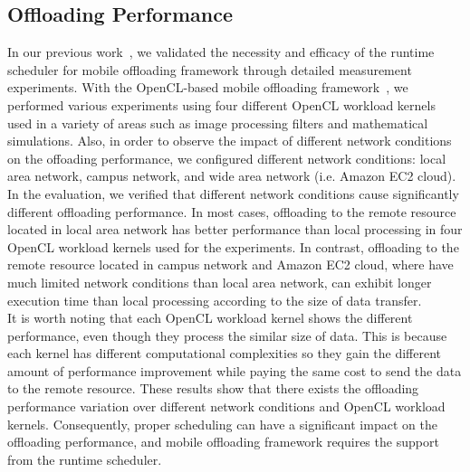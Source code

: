 \documentclass[10pt, conference, compsocconf]{IEEEtran}
\begin{document}
\subsection{Offloading Performance}
%
In our previous work~\cite{ml}, we validated the necessity and efficacy
of the runtime scheduler for mobile offloading framework through
detailed measurement experiments.
%
With the OpenCL-based mobile offloading framework~\cite{ocloff}, we
performed various experiments using four different OpenCL workload
kernels used in a variety of areas such as image processing filters and
mathematical simulations.
%
Also, in order to observe the impact of different network conditions on
the offoading performance, we configured different network conditions:
local area network, campus network, and wide area network (i.e. Amazon
EC2 cloud).
%
In the evaluation, we verified that different network conditions cause
significantly different offloading performance.
%
In most cases, offloading to the remote resource located in local area
network has better performance than local processing in four OpenCL
workload kernels used for the experiments.
%
In contrast, offloading to the remote resource located in campus network
and Amazon EC2 cloud, where have much limited network conditions than
local area network, can exhibit longer execution time than local
processing according to the size of data transfer.\\ 
%
\indent It is worth noting that each OpenCL workload kernel shows
the different performance, even though they process the similar size of
data.
%
This is because each kernel has different computational complexities so
they gain the different amount of performance improvement while paying
the same cost to send the data to the remote resource.
%
These results show that there exists the offloading performance
variation over different network conditions and OpenCL workload kernels.
%
Consequently, proper scheduling can have a significant impact on the
offloading performance, and mobile offloading framework requires the
support from the runtime scheduler.
%
\end{document}
